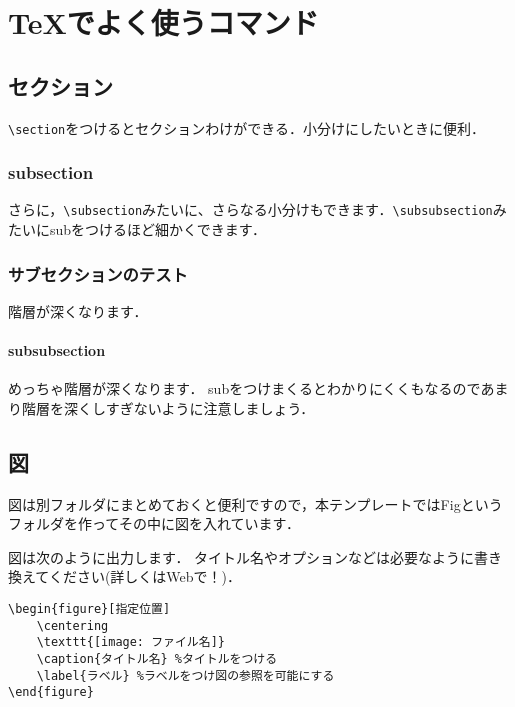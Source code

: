 

\chapter{TeXでよく使うコマンド}

\section{セクション}

\verb|\section|をつけるとセクションわけができる．小分けにしたいときに便利．
\subsection{subsection}
さらに，\verb|\subsection|みたいに、さらなる小分けもできます．\verb|\subsubsection|みたいにsubをつけるほど細かくできます．

\subsection{サブセクションのテスト}

階層が深くなります．

\subsubsection{subsubsection}

めっちゃ階層が深くなります．
subをつけまくるとわかりにくくもなるのであまり階層を深くしすぎないように注意しましょう．

\section{図}

図は別フォルダにまとめておくと便利ですので，本テンプレートではFigというフォルダを作ってその中に図を入れています．

図は次のように出力します．
タイトル名やオプションなどは必要なように書き換えてください(詳しくはWebで！)．
\begin{verbatim}
\begin{figure}[指定位置]
    \centering
    \texttt{[image: ファイル名]}
    \caption{タイトル名} %タイトルをつける
    \label{ラベル} %ラベルをつけ図の参照を可能にする
\end{figure}
\end{verbatim}


